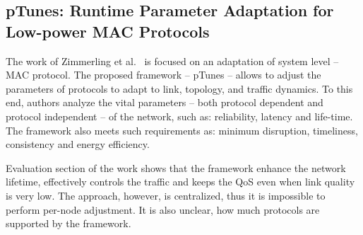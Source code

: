 \subsection{pTunes: Runtime Parameter Adaptation for Low-power MAC Protocols}

The work of Zimmerling et al.~\cite{zimmerling12} is focused on an adaptation of system level -- MAC
protocol. The proposed framework -- pTunes -- allows to adjust the parameters
of protocols to adapt to link, topology, and traffic dynamics. To this end, authors
analyze the vital parameters -- both protocol dependent and protocol independent
-- of the network, such as: reliability, latency and life-time. The framework also
meets such requirements as: minimum disruption, timeliness, consistency and
energy efficiency.

Evaluation section of the work shows that the framework enhance the network
lifetime, effectively controls the traffic and keeps the QoS even when link
quality is very low. The approach, however, is centralized, thus it is
impossible to perform per-node adjustment. It is also unclear, how much
protocols are supported by the framework.